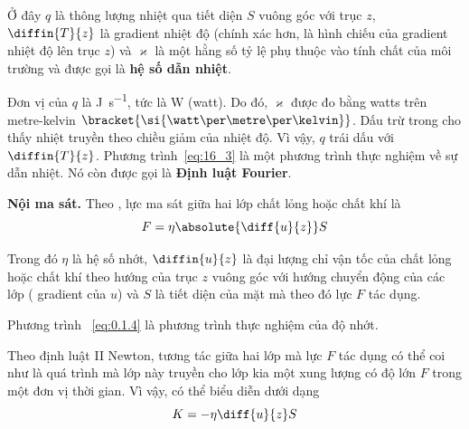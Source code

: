 \noindent
Ở đây $q$ là thông lượng nhiệt qua tiết diện $S$ vuông góc với trục $z$, $\diffin{T}{z}$ là gradient nhiệt độ (chính xác hơn, là hình chiếu của gradient nhiệt độ lên trục $z$) và $\varkappa$ là một hằng số tỷ lệ phụ thuộc vào tính chất của môi trường và được gọi là \textbf{hệ số dẫn nhiệt}.

Đơn vị của $q$ là \si{\joule\per\second}, tức là \si{\watt} (watt). Do đó, $\varkappa$ được đo bằng watts trên metre-kelvin $\bracket{\si{\watt\per\metre\per\kelvin}}$. Dấu trừ trong  cho thấy nhiệt truyền theo chiều giảm của nhiệt độ. Vì vậy, $q$ trái dấu với $\diffin{T}{z}$. Phương trình~\eqref{eq:16_3} là một phương trình thực nghiệm về sự dẫn nhiệt. Nó còn được gọi là \textbf{Định luật Fourier}.

\textbf{Nội ma sát.} Theo , lực ma sát giữa hai lớp chất lỏng hoặc chất khí là
\begin{equation}\label{eq:0.1.4}
    F = \eta \absolute{\diff{u}{z}} S
\end{equation}

\noindent
Trong đó $\eta$ là hệ số nhớt, $\diffin{u}{z}$ là đại lượng chỉ vận tốc của chất lỏng hoặc chất khí theo hướng của trục $z$ vuông góc với hướng chuyển động của các lớp ( gradient của $u$) và $S$ là tiết diện của mặt mà theo đó lực $F$ tác dụng.

Phương trình ~\eqref{eq:0.1.4} là phương trình thực nghiệm của độ nhớt.

Theo định luật II Newton, tương tác giữa hai lớp mà lực $F$ tác dụng có thể coi như là quá trình mà lớp này truyền cho lớp kia một xung lượng có độ lớn $F$ trong một đơn vị thời gian. Vì vậy, có thể biểu diễn  dưới dạng
\begin{equation}\label{eq:16_5}
    K = -\eta \diff{u}{z} S
\end{equation}

